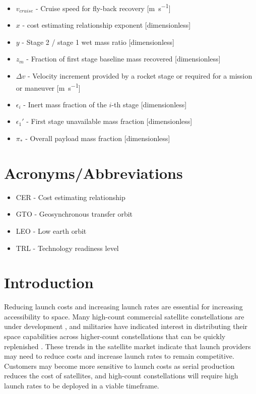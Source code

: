 \documentclass{iaf-iac}
\begin{document}
\begin{multicols}{2}
\begin{itemize}
    \item $v_{cruise}$ - Cruise speed for fly-back recovery [\si{\meter\per\second}]
    \item $x$ - cost estimating relationship exponent [dimensionless]
    \item $y$ - Stage 2 / stage 1 wet mass ratio [dimensionless]
    \item $z_m$ - Fraction of first stage baseline mass recovered [dimensionless]
    \item $\Delta v$ - Velocity increment provided by a rocket stage or required for a mission or maneuver [\si{\meter\per\second}]
    \item $\epsilon_i$ - Inert mass fraction of the $i$-th stage [dimensionless]
    \item $\epsilon_1'$ - First stage unavailable mass fraction [dimensionless]
    \item $\pi_*$ - Overall payload mass fraction [dimensionless]
\end{itemize}

\section*{Acronyms/Abbreviations}
\begin{itemize}
    \item CER - Cost estimating relationship
    \item GTO - Geosynchronous transfer orbit
    \item LEO - Low earth orbit
    \item TRL - Technology readiness level
\end{itemize}

\section{Introduction}

Reducing launch costs and increasing launch rates are essential for increasing accessibility to space. Many high-count commercial satellite constellations are under development \cite{SIA2017, Henry2017}, and militaries have indicated interest in distributing their space capabilities across higher-count constellations that can be quickly replenished \cite{DARPA_Blackjack}. These trends in the satellite market indicate that launch providers may need to reduce costs and increase launch rates to remain competitive. Customers may become more sensitive to launch costs as serial production reduces the cost of satellites, and high-count constellations will require high launch rates to be deployed in a viable timeframe.


\end{multicols}
\end{document}
